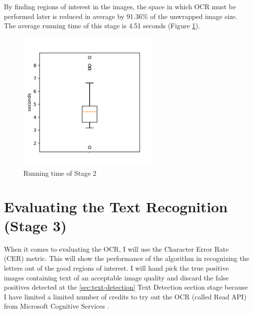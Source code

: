 By finding regions of interest in the images, the space in which OCR must be performed later is reduced in average by 91.36\% of the unwrapped image size. The average running time of this stage is 4.51 seconds (Figure \ref{fig:running_time-stage2}).

\begin{figure}
    \centering
    \begin{minipage}[c]{0.5\linewidth}
        \centering
        \includegraphics[height=7cm, keepaspectratio]{img/evaluation/running_time-stage2.pdf}
            \caption{Running time of Stage 2}
            \label{fig:running_time-stage2}
    \end{minipage}\hfill
\end{figure}

\section{Evaluating the Text Recognition (Stage 3)}\label{section:evaluation-ocr}

When it comes to evaluating the OCR, I will use the Character Error Rate (CER) \cite{site:evaluation-OCR-character_error_rate} metric. This will show the performance of the algorithm in recognizing the letters out of the good regions of interest. I will hand pick the true positive images containing text of an acceptable image quality and discard the false positives detected at the \ref{sec:text-detection} Text Detection section stage because I have limited a limited number of credits to try out the OCR (called Read API) from Microsoft Cognitive Services \cite{site:Microsoft_Cognitive_Services}.

